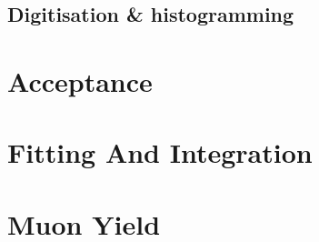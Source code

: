 \documentclass[]{article}
\begin{document}
\subsection{Digitisation \& histogramming} %
\label{sub:digitisation_histogramming}

\section{Acceptance} %
\label{sec:acceptance}

\section{Fitting And Integration} %
\label{sec:fitting_and_integration}

\section{Muon Yield} %
\label{sec:muon_yield}

\appendix
\end{document}
